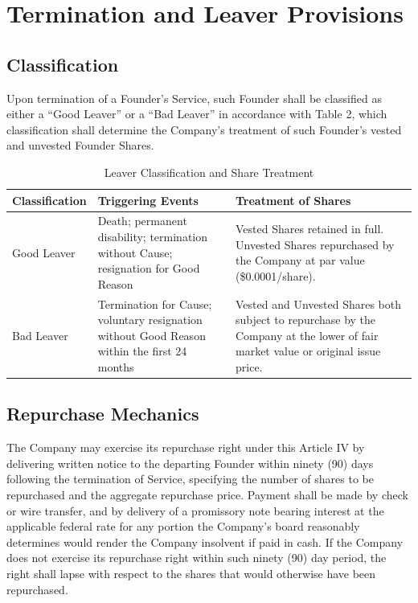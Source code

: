 \section{Termination and Leaver Provisions}

\subsection{Classification} Upon termination of a Founder's Service, such Founder shall be classified as either a ``Good Leaver'' or a ``Bad Leaver'' in accordance with Table 2, which classification shall determine the Company's treatment of such Founder's vested and unvested Founder Shares.

\begin{table}[h]
  \centering
  \caption{Leaver Classification and Share Treatment}
  \label{tab:leaver}
  \begin{tabularx}{\textwidth}{l X X}
    \toprule
    \textbf{Classification} & \textbf{Triggering Events} & \textbf{Treatment of Shares} \\
    \midrule
    Good Leaver & Death; permanent disability; termination without Cause; resignation for Good Reason & Vested Shares retained in full. Unvested Shares repurchased by the Company at par value (\$0.0001/share). \\
    \addlinespace
    Bad Leaver & Termination for Cause; voluntary resignation without Good Reason within the first 24 months & Vested and Unvested Shares both subject to repurchase by the Company at the lower of fair market value or original issue price. \\
    \bottomrule
  \end{tabularx}
\end{table}

\subsection{Repurchase Mechanics} The Company may exercise its repurchase right under this Article IV by delivering written notice to the departing Founder within ninety (90) days following the termination of Service, specifying the number of shares to be repurchased and the aggregate repurchase price. Payment shall be made by check or wire transfer, and by delivery of a promissory note bearing interest at the applicable federal rate for any portion the Company's board reasonably determines would render the Company insolvent if paid in cash. If the Company does not exercise its repurchase right within such ninety (90) day period, the right shall lapse with respect to the shares that would otherwise have been repurchased.

